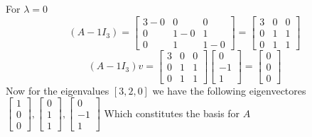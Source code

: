 \documentclass[12pt]{article}
\begin{document}
For $\lambda = 0$
\begin{equation*}
    (A-1I_3) =
    \begin{bmatrix}
        3 - 0 & 0 & 0 \\
        0 & 1 - 0 & 1 \\
        0 & 1 & 1 - 0
    \end{bmatrix} 
    =
      \begin{bmatrix}
        3 & 0 & 0 \\
        0 & 1 & 1 \\
        0 & 1 & 1
    \end{bmatrix} 
\end{equation*}
\begin{equation*}
    (A-1I_3)v =
 \begin{bmatrix}
        3 & 0 & 0 \\
        0 & 1 & 1 \\
        0 & 1 & 1
    \end{bmatrix} 
    \begin{bmatrix}
        0 \\
        -1 \\
        1
    \end{bmatrix}
    =
    \begin{bmatrix}
        0 \\
        0 \\
        0
    \end{bmatrix} 
\end{equation*}
Now for the eigenvalues $[3,2,0]$ we have the following eigenvectores $\begin{bmatrix}
    1 \\ 0 \\ 0
\end{bmatrix}, \begin{bmatrix}
    0 \\ 1\\ 1
\end{bmatrix}, \begin{bmatrix}
    0 \\ -1\\ 1
\end{bmatrix}$
Which constitutes the basis for $A$
\end{document}
